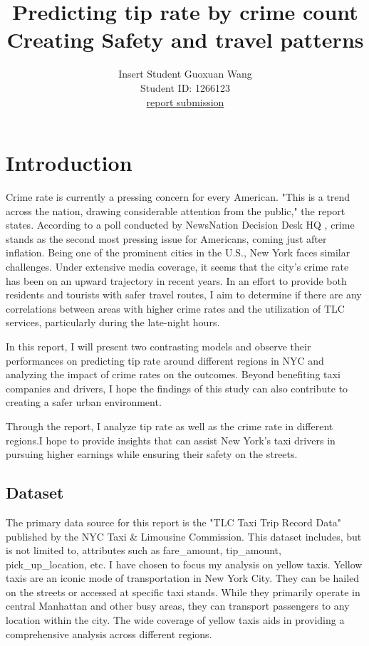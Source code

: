 \documentclass[11pt]{article}
\title{\textbf{Predicting tip rate by crime count} \\ Creating Safety and travel patterns}
\author{
Insert Student Guoxuan Wang \\
Student ID: 1266123 \\
\href{https://github.com/MAST30034-Applied-Data-Science/mast30034-project-1-flgg0202.git}{report submission}
}
\begin{document}
\maketitle

\section{Introduction}
Crime rate is currently a pressing concern for every American. "This is a trend across the nation, drawing considerable attention from the public," the report states. According to a poll conducted by NewsNation Decision Desk HQ \cite{Crimepressing}, crime stands as the second most pressing issue for Americans, coming just after inflation. Being one of the prominent cities in the U.S., New York faces similar challenges. Under extensive media coverage, it seems that the city's crime rate has been on an upward trajectory in recent years. In an effort to provide both residents and tourists with safer travel routes, I aim to determine if there are any correlations between areas with higher crime rates and the utilization of TLC services, particularly during the late-night hours.

In this report, I will present two contrasting models and observe their performances on predicting tip rate around different regions in NYC and analyzing the impact of crime rates on the outcomes. Beyond benefiting taxi companies and drivers, I hope the findings of this study can also contribute to creating a safer urban environment.

Through the report, I analyze tip rate as well as the crime rate in different regions.I hope to provide insights that can assist New York's taxi drivers in pursuing higher earnings while ensuring their safety on the streets.

\subsection{Dataset}
The primary data source for this report is the "TLC Taxi Trip Record Data" published by the NYC Taxi \& Limousine Commission.\cite{tlc} This dataset includes, but is not limited to, attributes such as fare\_amount, tip\_amount, pick\_up\_location, etc. I have chosen to focus my analysis on yellow taxis. Yellow taxis are an iconic mode of transportation in New York City. They can be hailed on the streets or accessed at specific taxi stands. While they primarily operate in central Manhattan and other busy areas, they can transport passengers to any location within the city. The wide coverage of yellow taxis aids in providing a comprehensive analysis across different regions.
\end{document}
